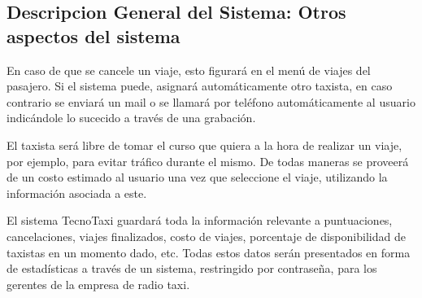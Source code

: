 	\subsection{Descripcion General del Sistema: Otros aspectos del sistema}
	En caso de que se cancele un viaje, esto figurará en el menú de viajes del pasajero. Si el sistema puede, asignará automáticamente otro taxista, en caso contrario se enviará un mail o se llamará por teléfono automáticamente al usuario indicándole lo sucecido a través de una grabación.

	El taxista será libre de tomar el curso que quiera a la hora de realizar un viaje, por ejemplo, para evitar tráfico durante el mismo. De todas maneras se proveerá de un costo estimado al usuario una vez que seleccione el viaje, utilizando la información asociada a este.

	El sistema TecnoTaxi guardará toda la información relevante a puntuaciones, cancelaciones, viajes finalizados, costo de viajes, porcentaje de disponibilidad de taxistas en un momento dado, etc. Todas estos datos serán presentados en forma de estadísticas a través de un sistema, restringido por contraseña, para los gerentes de la empresa de radio taxi. 